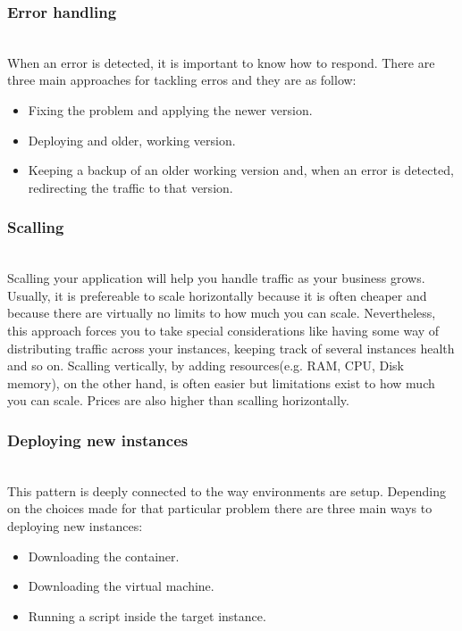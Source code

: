 \documentclass{llncs}
\begin{document}
    \subsubsection{Error handling}~\\
    When an error is detected, it is important to know how to respond. There are three main approaches for tackling erros and they are as follow:
    \begin{itemize}
      \item Fixing the problem and applying the newer version.
      \item Deploying and older, working version.
      \item Keeping a backup of an older working version and, when an error is detected, redirecting the traffic to that version.
    \end{itemize}

    \subsubsection{Scalling}~\\
    Scalling your application will help you handle traffic as your business grows.
    Usually, it is prefereable to scale horizontally because it is often cheaper and because there are virtually no limits to how much you can scale. Nevertheless, this approach forces you to take special considerations like having some way of distributing traffic across your instances, keeping track of several instances health and so on.
    Scalling vertically, by adding resources(e.g. RAM, CPU, Disk memory), on the other hand, is often easier but limitations exist to how much you can scale. Prices are also higher than scalling horizontally.

    \subsubsection{Deploying new instances}~\\
    This pattern is deeply connected to the way environments are setup. Depending on the choices made for that particular problem there are three main ways to deploying new instances:
    \begin{itemize}
      \item Downloading the container.
      \item Downloading the virtual machine.
      \item Running a script inside the target instance.
    \end{itemize}
\end{document}
